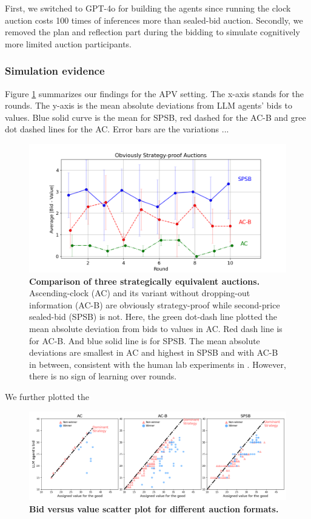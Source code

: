 \documentclass{article} %
\begin{document}
First, we switched to GPT-4o for building the agents since running the clock auction costs 100 times of inferences more than sealed-bid auction. Secondly, we removed the plan and reflection part during the bidding to simulate cognitively more limited auction participants.




\subsubsection{Simulation evidence}
Figure \ref{fig:osp} summarizes our findings for the APV setting. The x-axis stands for the rounds.
The y-axis is the mean absolute
deviations from LLM agents' bids to values. Blue solid curve is the mean for SPSB, red dashed for the AC-B and gree dot dashed lines for the AC.
Error bars are the variations ...

\begin{figure}[h]  
    \centering  
\includegraphics[width=\linewidth]{Figs/OSP.png}  
    \caption{\textbf{Comparison of three strategically equivalent auctions.} Ascending-clock (AC) and its variant without dropping-out information (AC-B) are obviously strategy-proof while second-price sealed-bid (SPSB) is not. Here, the green dot-dash line plotted the mean absolute deviation from bids to values in AC. Red dash line is for AC-B. And blue solid line is for SPSB. The mean absolute deviations are smallest in AC and highest in SPSB and with AC-B in between, consistent with the human lab experiments in \cite{breitmoser2022obviousness}. However, there is no sign of learning over rounds.}
    \label{fig:osp}
\end{figure}

We further plotted the 
\begin{figure}[h]  
    \centering  
\includegraphics[width=\linewidth]{Figs/osp_scatter_plots.png}  
    \caption{\textbf{Bid versus value scatter plot for different auction formats.}}
    \label{fig:osp_bid}
\end{figure}
\end{document}
